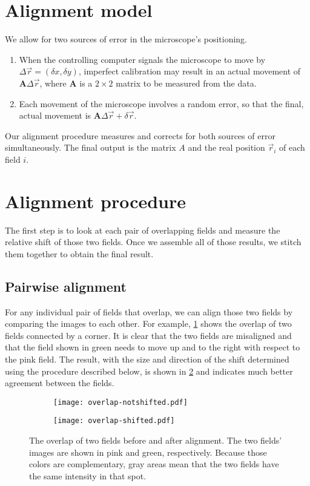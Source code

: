 \documentclass{article}
\newcommand{\matrixbold}[1]{\mathbf{#1}}
\begin{document}
\section{Alignment model}

We allow for two sources of error in the microscope's positioning.
\begin{enumerate}
\item When the controlling computer signals the microscope to move by $\Delta \vec{r}=(\delta x, \delta y)$, imperfect calibration may result in an actual movement of $\matrixbold{A}\Delta\vec{r}$, where $\matrixbold{A}$ is a $2\times2$ matrix to be measured from the data.
\item Each movement of the microscope involves a random error, so that the final, actual movement is $\matrixbold{A}\Delta\vec{r}+\delta\vec{r}$.
\end{enumerate}
Our alignment procedure measures and corrects for both sources of error simultaneously.  The final output is the matrix $A$ and the real position $\vec{r}_i$ of each field $i$.

\section{Alignment procedure}

The first step is to look at each pair of overlapping fields and measure the relative shift of those two fields.  Once we assemble all of those results, we stitch them together to obtain the final result.

\subsection{Pairwise alignment}
\label{sec:pairwise}

For any individual pair of fields that overlap, we can align those two fields by comparing the images to each other.  For example, \cref{fig:overlapbefore} shows the overlap of two fields connected by a corner.  It is clear that the two fields are misaligned and that the field shown in green needs to move up and to the right with respect to the pink field.  The result, with the size and direction of the shift determined using the procedure described below, is shown in \cref{fig:overlapafter} and indicates much better agreement between the fields.

\begin{figure}[ht]
	\centering
	\begin{subfigure}{0.45\linewidth}
	\texttt{[image: overlap-notshifted.pdf]}
	\caption{}
	\label{fig:overlapbefore}
	\end{subfigure}
	\begin{subfigure}{0.45\linewidth}
	\texttt{[image: overlap-shifted.pdf]}
	\caption{}
	\label{fig:overlapafter}
	\end{subfigure}
	\caption{The overlap of two fields  before and  after alignment.  The two fields' images are shown in pink and green, respectively.  Because those colors are complementary, gray areas mean that the two fields have the same intensity in that spot.}
	\label{fig:overlap}
\end{figure}
\end{document}
